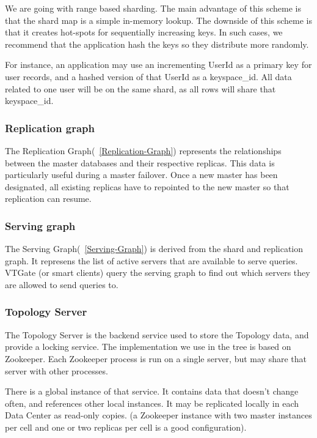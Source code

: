 We are going with range based sharding.
The main advantage of this scheme is that the shard map is a simple in-memory lookup.
The downside of this scheme is that it creates hot-spots for sequentially increasing keys.
In such cases, we recommend that the application hash the keys so they
distribute more randomly.

For instance, an application may use an incrementing UserId as a primary key for user records,
and a hashed version of that UserId as a keyspace\_id. All data related to one user will be on
the same shard, as all rows will share that keyspace\_id.

\subsubsection{Replication graph}\hypertarget{replication-graph}{}\label{replication-graph}

The Replication Graph(~\ref{Replication-Graph}) represents the relationships between the master
databases and their respective replicas.
This data is particularly useful during a master failover.
Once a new master has been designated, all existing replicas have to
repointed to the new master so that replication can resume.

\subsubsection{Serving graph}

The Serving Graph(~\ref{Serving-Graph}) is derived from the shard and replication graph.
It represens the list of active servers that are available to serve
queries.
VTGate (or smart clients) query the serving graph to find out which servers
they are allowed to send queries to.

\subsubsection{Topology Server}\label{topology-server}

The Topology Server is the backend service used to store the Topology data, and provide a locking service. The implementation we use in the tree is based on Zookeeper. Each Zookeeper process is run on a single server, but may share that server with other processes.

There is a global instance of that service. It contains data that doesn't change often, and references other local instances. It may be replicated locally in each Data Center as read-only copies. (a Zookeeper instance with two master instances per cell and one or two replicas per cell is a good configuration).

